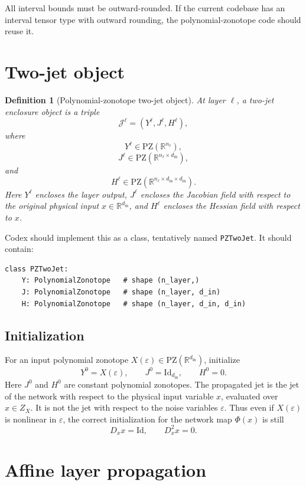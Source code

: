 \documentclass[11pt]{article}
\newtheorem{definition}{Definition}[section]
\newcommand{\R}{\mathbb{R}}
\newcommand{\PZ}{\mathrm{PZ}}
\newcommand{\eps}{\varepsilon}
\newcommand{\Id}{\mathrm{Id}}
\begin{document}
All interval bounds must be outward-rounded. If the current codebase has an interval tensor type with outward rounding, the polynomial-zonotope code should reuse it.

\section{Two-jet object}

\begin{definition}[Polynomial-zonotope two-jet object]
At layer \(\ell\), a two-jet enclosure object is a triple
\[
    \mathcal{J}^\ell=(Y^\ell,J^\ell,H^\ell),
\]
where
\[
    Y^\ell\in\PZ(\R^{n_\ell}),
\]
\[
    J^\ell\in\PZ(\R^{n_\ell\times d_{\mathrm{in}}}),
\]
and
\[
    H^\ell\in\PZ(\R^{n_\ell\times d_{\mathrm{in}}\times d_{\mathrm{in}}}).
\]
Here \(Y^\ell\) encloses the layer output, \(J^\ell\) encloses the Jacobian field with respect to the original physical input \(x\in\R^{d_{\mathrm{in}}}\), and \(H^\ell\) encloses the Hessian field with respect to \(x\).
\end{definition}

Codex should implement this as a class, tentatively named \texttt{PZTwoJet}. It should contain:
\begin{verbatim}
class PZTwoJet:
    Y: PolynomialZonotope   # shape (n_layer,)
    J: PolynomialZonotope   # shape (n_layer, d_in)
    H: PolynomialZonotope   # shape (n_layer, d_in, d_in)
\end{verbatim}

\subsection{Initialization}

For an input polynomial zonotope \(X(\eps)\in\PZ(\R^{d_{\mathrm{in}}})\), initialize
\[
    Y^0=X(\eps),
    \qquad
    J^0=\Id_{d_{\mathrm{in}}},
    \qquad
    H^0=0.
\]
Here \(J^0\) and \(H^0\) are constant polynomial zonotopes. The propagated jet is the jet of the network with respect to the physical input variable \(x\), evaluated over \(x\in Z_X\). It is not the jet with respect to the noise variables \(\eps\). Thus even if \(X(\eps)\) is nonlinear in \(\eps\), the correct initialization for the network map \(\Phi(x)\) is still
\[
    D_xx=\Id,
    \qquad
    D_x^2x=0.
\]

\section{Affine layer propagation}
\end{document}
